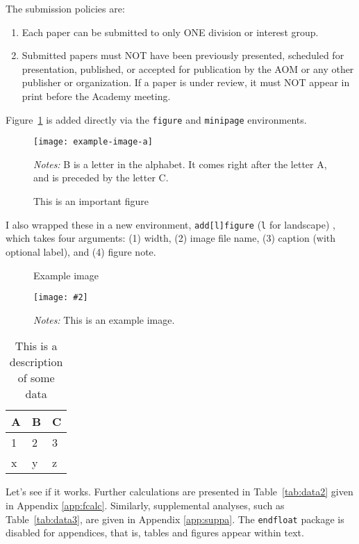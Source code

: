 \documentclass[12pt,letterpaper]{article}
\theoremstyle{plain}
\newenvironment{lfigure}[1][h]{
    \begin{landscape}
    \begin{figure}[#1]
}{
    \end{figure}
    \end{landscape}
}
\newcommand\figurenote[2][width=\linewidth]{
    \captionsetup{#1,font=small}
    \caption*{\textit{Notes:} {#2}}
}
\newenvironment{addlfigure}[4]{
    \begin{lfigure}[h]
        \centering
        \caption{#3}
        \begin{minipage}{#1}
            \texttt{[image: \#2]}
            \figurenote{#4}
}{\end{minipage}\end{lfigure}}
\begin{document}
\blindtext

The submission policies are:
\begin{enumerate}
    \item Each paper can be submitted to only ONE division or interest group.
    \item Submitted papers must NOT have been previously presented, scheduled for presentation, published, or accepted for publication by the AOM or any other publisher or organization. If a paper is under review, it must NOT appear in print before the Academy meeting.
\end{enumerate}

Figure~\ref{fig:a} is added directly via the \verb*|figure| and \verb*|minipage| environments.

\begin{figure}[h]
    \centering
    \caption{This is an important figure}\label{fig:a}
    \begin{minipage}{.5\linewidth}
    \texttt{[image: example-image-a]}
    \figurenote{B is a letter in the alphabet. It comes right after the letter A, and is preceded by the letter C. \blindtext}
    \end{minipage}
\end{figure}

I also wrapped these in a new environment, \verb*|add[l]figure| (\verb*|l| for landscape) , which takes four arguments: (1) width, (2) image file name, (3) caption (with optional label), and (4) figure note.

\begin{addlfigure}{0.25\linewidth}
	{example-image-b}{Example image\label{fig:b}}
	{This is an example image. \blindtext}
\end{addlfigure}

\blindtext

\begin{table}[h]
    \centering
    \caption{This is a description of some data}
    \label{tab:data1}
    \begin{tabular}{|l|l|l|}
        \hline
        A & B & C \\ \hline \hline
        1 & 2 & 3 \\ \hline
        x & y & z \\ \hline
    \end{tabular}
\end{table}

Let's see if it works. Further calculations are presented in Table~\ref{tab:data2} given in Appendix \ref{app:fcalc}. Similarly, supplemental analyses, such as Table~\ref{tab:data3}, are given in Appendix \ref{app:suppa}. The \verb*|endfloat| package is disabled for appendices, that is, tables and figures appear within text.
\end{document}
